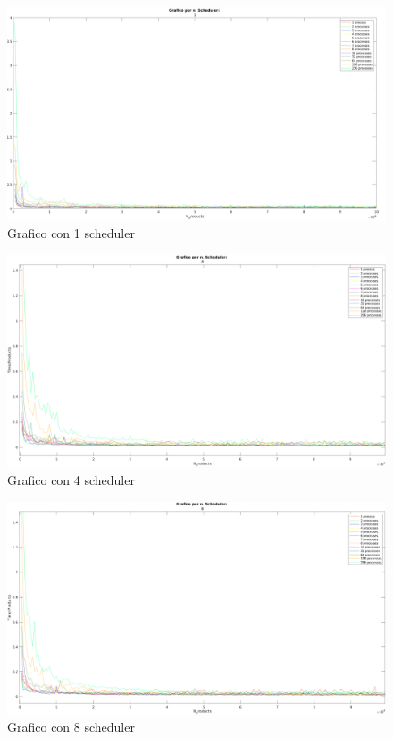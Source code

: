 \begin{figure}[!htp]
    \centering
    \includegraphics[keepaspectratio=true,scale=0.33]{images/matlab/1_scheduler.png}
	\caption{Grafico con 1 scheduler}
  	\label{fig:1_scheduler}
\end{figure}

\begin{figure}[!htp]
    \centering
    \includegraphics[keepaspectratio=true,scale=0.335]{images/matlab/4_scheduler.png}
	\caption{Grafico con 4 scheduler}
  	\label{fig:4_scheduler}
\end{figure}

\begin{figure}[!htp]
    \centering
    \includegraphics[keepaspectratio=true,scale=0.335]{images/matlab/8_scheduler.png}
	\caption{Grafico con 8 scheduler}
  	\label{fig:8_scheduler}
\end{figure}

